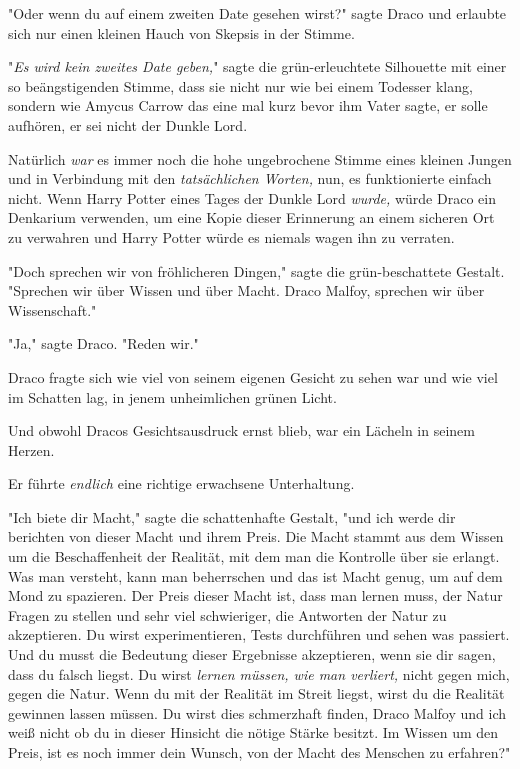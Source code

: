 {"Oder wenn du auf einem zweiten Date gesehen wirst?" sagte Draco und erlaubte sich nur einen kleinen Hauch von Skepsis in der Stimme.

"\emph{Es wird kein zweites Date geben,}" sagte die grün-erleuchtete Silhouette mit einer so beängstigenden Stimme, dass sie nicht nur wie bei einem Todesser klang, sondern wie Amycus Carrow das eine mal kurz bevor ihm Vater sagte, er solle aufhören, er sei nicht der Dunkle Lord.

Natürlich \emph{war} es immer noch die hohe ungebrochene Stimme eines kleinen Jungen und in Verbindung mit den \emph{tatsächlichen Worten,} nun, es funktionierte einfach nicht. Wenn Harry Potter eines Tages der Dunkle Lord \emph{wurde,} würde Draco ein Denkarium verwenden, um eine Kopie dieser Erinnerung an einem sicheren Ort zu verwahren und Harry Potter würde es niemals wagen ihn zu verraten.

"Doch sprechen wir von fröhlicheren Dingen," sagte die grün-beschattete Gestalt. "Sprechen wir über Wissen und über Macht. Draco Malfoy, sprechen wir über Wissenschaft."

"Ja," sagte Draco. "Reden wir."

Draco fragte sich wie viel von seinem eigenen Gesicht zu sehen war und wie viel im Schatten lag, in jenem unheimlichen grünen Licht.

Und obwohl Dracos Gesichtsausdruck ernst blieb, war ein Lächeln in seinem Herzen.

Er führte \emph{endlich} eine richtige erwachsene Unterhaltung.

"Ich biete dir Macht," sagte die schattenhafte Gestalt, "und ich werde dir berichten von dieser Macht und ihrem Preis. Die Macht stammt aus dem Wissen um die Beschaffenheit der Realität, mit dem man die Kontrolle über sie erlangt. Was man versteht, kann man beherrschen und das ist Macht genug, um auf dem Mond zu spazieren. Der Preis dieser Macht ist, dass man lernen muss, der Natur Fragen zu stellen und sehr viel schwieriger, die Antworten der Natur zu akzeptieren. Du wirst experimentieren, Tests durchführen und sehen was passiert. Und du musst die Bedeutung dieser Ergebnisse akzeptieren, wenn sie dir sagen, dass du falsch liegst. Du wirst \emph{lernen müssen, wie man verliert,} nicht gegen mich, gegen die Natur. Wenn du mit der Realität im Streit liegst, wirst du die Realität gewinnen lassen müssen. Du wirst dies schmerzhaft finden, Draco Malfoy und ich weiß nicht ob du in dieser Hinsicht die nötige Stärke besitzt. Im Wissen um den Preis, ist es noch immer dein Wunsch, von der Macht des Menschen zu erfahren?"

}
